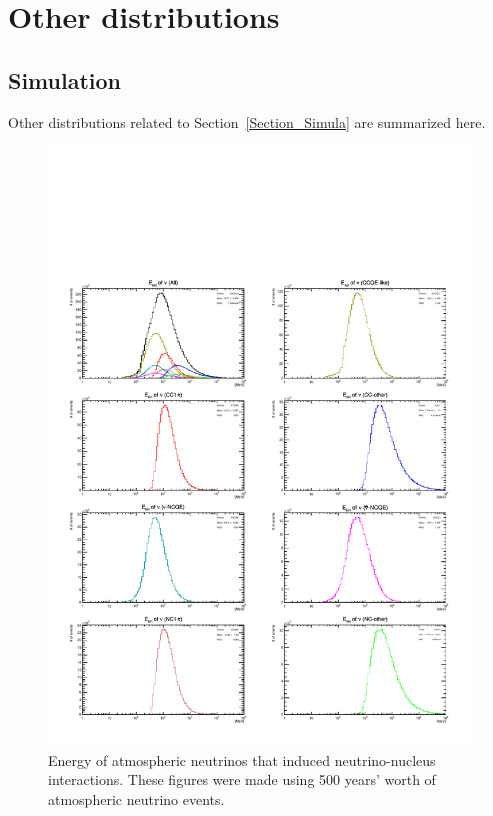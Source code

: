 
%
%

\section{Other distributions}\label{App_Other}





\subsection{Simulation}\label{App_Simula}
\vs\hs
Other distributions related to Section~\ref{Section_Simula} are summarized here.

\begin{figure}[H]
	\centering
	\includegraphics[width=16cm]{PDF/NEUT/s1_2_official/gamma/LogEneNeu}
	\caption[Energy of atmospheric neutrinos that induced neutrino-nucleus interactions]{
	Energy of atmospheric neutrinos that induced neutrino-nucleus interactions.
	These figures were made using 500 years' worth of atmospheric neutrino events.
	}\label{gammaLogEneNeu}
\end{figure}

